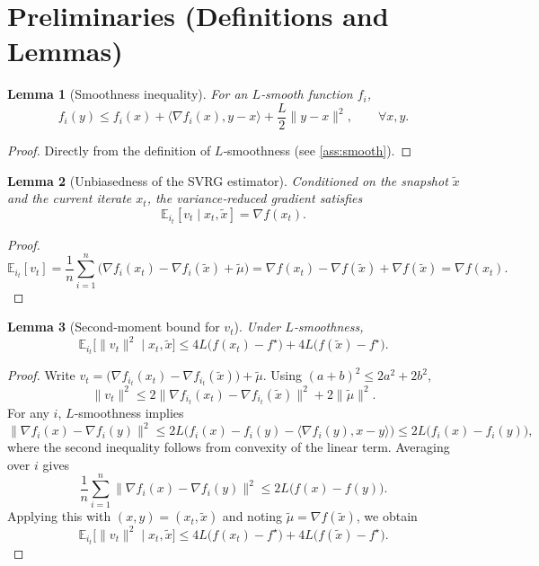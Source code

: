 \documentclass{article}
\newtheorem{lemma}{Lemma}
\newcommand{\E}{\mathbb{E}}
\begin{document}
\section*{Preliminaries (Definitions and Lemmas)}
\begin{lemma}[Smoothness inequality]\label{lem:smooth}
For an $L$‑smooth function $f_i$,
\[
f_i(y)\le f_i(x)+\langle\nabla f_i(x),y-x\rangle+\frac{L}{2}\|y-x\|^{2},\qquad\forall x,y.
\tag{L1}
\]
\end{lemma}
\begin{proof}
Directly from the definition of $L$‑smoothness (see \ref{ass:smooth}). \qedhere
\end{proof}

\begin{lemma}[Unbiasedness of the SVRG estimator]\label{lem:unbiased}
Conditioned on the snapshot $\tilde{x}$ and the current iterate $x_t$, the variance‑reduced gradient satisfies
\[
\E_{i_t}[v_t\mid x_t,\tilde{x}]=\nabla f(x_t).
\tag{L2}
\]
\end{lemma}
\begin{proof}
\[
\E_{i_t}[v_t]=\frac{1}{n}\sum_{i=1}^{n}
\bigl(\nabla f_i(x_t)-\nabla f_i(\tilde{x})+\tilde{\mu}\bigr)
= \nabla f(x_t)-\nabla f(\tilde{x})+\nabla f(\tilde{x})
= \nabla f(x_t).
\] \qedhere
\end{proof}

\begin{lemma}[Second‑moment bound for $v_t$]\label{lem:variance}
Under $L$‑smoothness,
\[
\E_{i_t}\bigl[\|v_t\|^{2}\mid x_t,\tilde{x}\bigr]
\le 4L\bigl(f(x_t)-f^{\star}\bigr)+4L\bigl(f(\tilde{x})-f^{\star}\bigr).
\tag{L3}
\]
\end{lemma}
\begin{proof}
Write $v_t=\bigl(\nabla f_{i_t}(x_t)-\nabla f_{i_t}(\tilde{x})\bigr)+\tilde{\mu}$.
Using $(a+b)^2\le 2a^2+2b^2$,
\[
\|v_t\|^{2}\le 2\|\nabla f_{i_t}(x_t)-\nabla f_{i_t}(\tilde{x})\|^{2}+2\|\tilde{\mu}\|^{2}.
\]
For any $i$, $L$‑smoothness implies
\[
\|\nabla f_i(x)-\nabla f_i(y)\|^{2}
\le 2L\bigl(f_i(x)-f_i(y)-\langle\nabla f_i(y),x-y\rangle\bigr)
\le 2L\bigl(f_i(x)-f_i(y)\bigr),
\]
where the second inequality follows from convexity of the linear term.
Averaging over $i$ gives
\[
\frac{1}{n}\sum_{i=1}^{n}\|\nabla f_i(x)-\nabla f_i(y)\|^{2}
\le 2L\bigl(f(x)-f(y)\bigr).
\]
Applying this with $(x,y)=(x_t,\tilde{x})$ and noting $\tilde{\mu}=\nabla f(\tilde{x})$, we obtain
\[
\E_{i_t}\bigl[\|v_t\|^{2}\mid x_t,\tilde{x}\bigr]
\le 4L\bigl(f(x_t)-f^{\star}\bigr)+4L\bigl(f(\tilde{x})-f^{\star}\bigr).
\] \qedhere
\end{proof}
\end{document}
